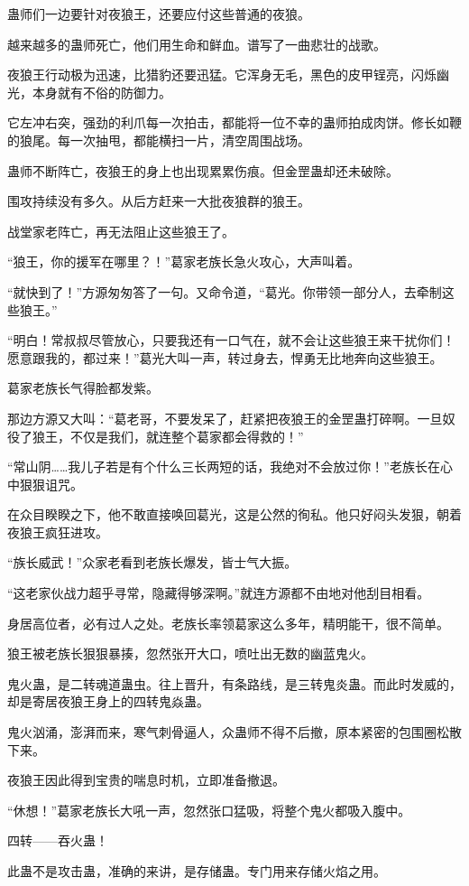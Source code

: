 \begin{this_body}
蛊师们一边要针对夜狼王，还要应付这些普通的夜狼。

越来越多的蛊师死亡，他们用生命和鲜血。谱写了一曲悲壮的战歌。

夜狼王行动极为迅速，比猎豹还要迅猛。它浑身无毛，黑色的皮甲锃亮，闪烁幽光，本身就有不俗的防御力。

它左冲右突，强劲的利爪每一次拍击，都能将一位不幸的蛊师拍成肉饼。修长如鞭的狼尾。每一次抽甩，都能横扫一片，清空周围战场。

蛊师不断阵亡，夜狼王的身上也出现累累伤痕。但金罡蛊却还未破除。

围攻持续没有多久。从后方赶来一大批夜狼群的狼王。

战堂家老阵亡，再无法阻止这些狼王了。

“狼王，你的援军在哪里？！”葛家老族长急火攻心，大声叫着。

“就快到了！”方源匆匆答了一句。又命令道，“葛光。你带领一部分人，去牵制这些狼王。”

“明白！常叔叔尽管放心，只要我还有一口气在，就不会让这些狼王来干扰你们！愿意跟我的，都过来！”葛光大叫一声，转过身去，悍勇无比地奔向这些狼王。

葛家老族长气得脸都发紫。

那边方源又大叫：“葛老哥，不要发呆了，赶紧把夜狼王的金罡蛊打碎啊。一旦奴役了狼王，不仅是我们，就连整个葛家都会得救的！”

“常山阴……我儿子若是有个什么三长两短的话，我绝对不会放过你！”老族长在心中狠狠诅咒。

在众目睽睽之下，他不敢直接唤回葛光，这是公然的徇私。他只好闷头发狠，朝着夜狼王疯狂进攻。

“族长威武！”众家老看到老族长爆发，皆士气大振。

“这老家伙战力超乎寻常，隐藏得够深啊。”就连方源都不由地对他刮目相看。

身居高位者，必有过人之处。老族长率领葛家这么多年，精明能干，很不简单。

狼王被老族长狠狠暴揍，忽然张开大口，喷吐出无数的幽蓝鬼火。

鬼火蛊，是二转魂道蛊虫。往上晋升，有条路线，是三转鬼炎蛊。而此时发威的，却是寄居夜狼王身上的四转鬼焱蛊。

鬼火汹涌，澎湃而来，寒气刺骨逼人，众蛊师不得不后撤，原本紧密的包围圈松散下来。

夜狼王因此得到宝贵的喘息时机，立即准备撤退。

“休想！”葛家老族长大吼一声，忽然张口猛吸，将整个鬼火都吸入腹中。

四转——吞火蛊！

此蛊不是攻击蛊，准确的来讲，是存储蛊。专门用来存储火焰之用。


\end{this_body}

